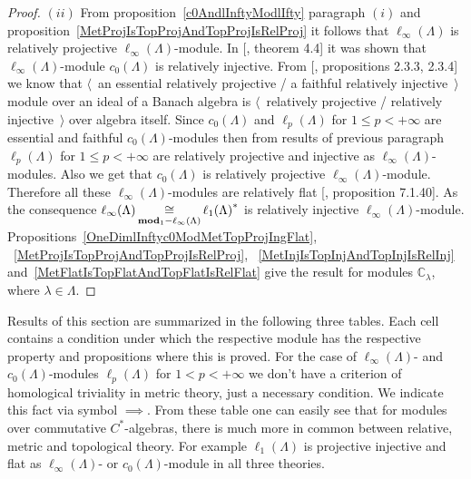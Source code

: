 \begin{proof}
$(ii)$ From proposition~\ref{c0AndlInftyModlIfty} paragraph $(i)$ and
proposition~\ref{MetProjIsTopProjAndTopProjIsRelProj} it follows that
$\ell_\infty(\Lambda)$ is relatively projective $\ell_\infty(\Lambda)$-module. 
In [\cite{NemANoteOnRelInjC0ModC0}, theorem 4.4] it was shown 
that $\ell_\infty(\Lambda)$-module $c_0(\Lambda)$ is relatively injective. 
From [\cite{RamsHomPropSemgroupAlg}, propositions 2.3.3, 2.3.4] we know that
$\langle$~an essential relatively projective / a  faithful relatively
injective~$\rangle$ module over an ideal of a Banach algebra is 
$\langle$~relatively projective / relatively injective~$\rangle$ over algebra 
itself. Since $c_0(\Lambda)$ and $\ell_p(\Lambda)$ for $1\leq p<+\infty$ are
essential and faithful $c_0(\Lambda)$-modules then from results of previous
paragraph $\ell_p(\Lambda)$ for $1\leq p<+\infty$ are relatively projective and
injective as $\ell_\infty(\Lambda)$-modules. Also we get that $c_0(\Lambda)$ is
relatively projective $\ell_\infty(\Lambda)$-module. Therefore all these
$\ell_\infty(\Lambda)$-modules are relatively flat [\cite{HelBanLocConvAlg},
proposition 7.1.40]. As the consequence $\ell_\infty(\Lambda)
\mathop{\mathbin{\cong}}\limits_{\mathbf{mod}_1-\ell_\infty(\Lambda)} {\ell_1(\Lambda)}^*$ is relatively
injective $\ell_\infty(\Lambda)$-module.
Propositions~\ref{OneDimlInftyc0ModMetTopProjIngFlat},
~\ref{MetProjIsTopProjAndTopProjIsRelProj},
~\ref{MetInjIsTopInjAndTopInjIsRelInj}
and~\ref{MetFlatIsTopFlatAndTopFlatIsRelFlat} give the result for modules
$\mathbb{C}_\lambda$, where $\lambda\in\Lambda$.
\end{proof}

Results of this section are summarized in the following three tables. Each cell
contains a condition under which the respective module has the respective
property and propositions where this is proved. For the case 
of $\ell_\infty(\Lambda)$- and $c_0(\Lambda)$-modules $\ell_p(\Lambda)$ 
for $1<p<+\infty$ we don't have a criterion of homological triviality in metric
theory, just a necessary condition. We indicate this fact via symbol $\implies$.
From these table one can easily see that for modules over commutative
$C^*$-algebras, there is much more in common between relative, metric and
topological  theory. For example $\ell_1(\Lambda)$ is projective injective and
flat as $\ell_\infty(\Lambda)$- or $c_0(\Lambda)$-module in all three theories.


